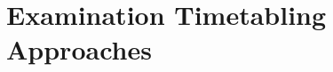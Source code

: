 \chapter{Examination Timetabling Approaches}
\label{theory}
\thispagestyle{plain}




\section{}




\section{}



\section{}
